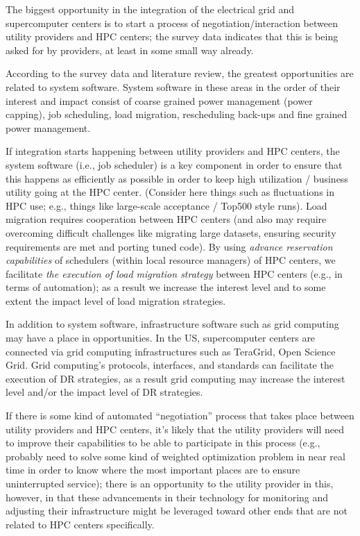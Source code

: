 The biggest opportunity in the integration of the electrical grid and supercomputer centers is to start a process of negotiation/interaction between utility providers and HPC centers; the survey data indicates that this is being asked for by providers, at least in some small way already.

According to the survey data and literature review, the greatest opportunities are related
to system software. System software in these areas in the order of their interest and impact 
consist of coarse grained power management (power capping), job scheduling, load migration,
rescheduling back-ups and 
fine grained power management.

If integration starts happening between utility providers and HPC centers, 
the system software (i.e., job scheduler) is a key component in order to ensure that this happens
as efficiently as possible in order to keep high utilization / business utility going at the
HPC center.  (Consider here things such as fluctuations in HPC use; 
e.g., things like large-scale acceptance / Top500 style runs). 
Load migration requires cooperation between HPC centers (and also may require overcoming difficult
challenges like migrating large 
datasets, ensuring security requirements are met and porting tuned code). 
By using \textit{advance reservation capabilities} of schedulers (within local resource managers) of HPC centers, we facilitate \textit{the execution of load migration strategy} between HPC centers (e.g., in terms of automation); as a result we increase the interest level and to some extent the impact level of load migration strategies.

In addition to system software, infrastructure software such as grid computing may have a place in opportunities. In the US, supercomputer centers are connected via grid computing infrastructures such as TeraGrid, Open Science Grid. Grid computing's protocols, interfaces, and standards can facilitate the execution of DR strategies, as a result grid computing may increase the interest level and/or the impact level of DR strategies.

If there is some kind of automated ``negotiation'' process that takes place between utility providers and HPC centers, it's likely that the utility providers will need to improve their capabilities to be able to participate in this process (e.g., probably need to solve some kind of weighted optimization problem in near real time in order to know where the most important places are to ensure uninterrupted service); there is an opportunity to the utility provider in this, however, in that these advancements in their technology for monitoring and adjusting their infrastructure might be leveraged toward other ends that are not related to HPC centers specifically.


